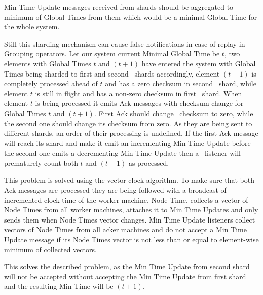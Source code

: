 Min Time Update messages received from shards should be aggregated to minimum of Global Times from them which would be a minimal Global Time for the whole system.

Still this sharding mechanism can cause false notifications in case of replay in Grouping operators. Let our system current Minimal Global Time be $t$, two elements with Global Times $t$ and $(t+1)$ have entered the system with Global Times being sharded to first and second \tracker\ shards accordingly, element $(t+1)$ is completely processed ahead of $t$ and has a zero checksum in second \tracker\ shard, while element $t$ is still in flight and has a non-zero checksum in first \tracker\ shard. When element $t$ is being processed it emits Ack messages with checksum change for Global Times $t$ and $(t+1)$. First Ack should change \tracker\ checksum to zero, while the second one should change its checksum from zero. As they are being sent to different shards, an order of their processing is undefined. If the first Ack message will reach its shard and make it emit an incrementing Min Time Update before the second one emits a decrementing Min Time Update then a \tracker\ listener will prematurely count both $t$ and $(t+1)$ as processed.

This problem is solved using the vector clock algorithm. To make sure that both Ack messages are processed they are being followed with a broadcast of incremented clock time of the worker machine, Node Time. \tracker collects a vector of Node Times from all worker machines, attaches it to Min Time Updates and only sends them when Node Times vector changes. Min Time Update listeners collect vectors of Node Times from all acker machines and do not accept a Min Time Update message if its Node Times vector is not less than or equal to element-wise minimum of collected vectors.

This solves the described problem, as the Min Time Update from second shard will not be accepted without accepting the Min Time Update from first shard and the resulting Min Time will be $(t+1)$.


